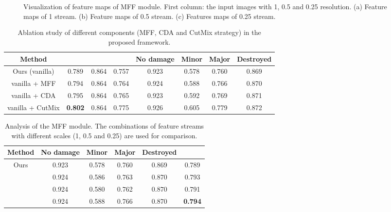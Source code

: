 \documentclass[journal]{IEEEtran}
\begin{document}
\begin{figure}[t]
	\centering
	  \\
	   \\
	\caption{Visualization of feature maps of MFF module. First column: the input images with 1, 0.5 and 0.25 resolution. (a) Feature maps of 1 stream. (b) Feature maps of 0.5 stream. (c) Features maps of 0.25 stream.}
	\label{figMscale}
\end{figure}


\begin{table*}[!t]
	\centering
	\caption{Ablation study of different components (MFF, CDA and CutMix strategy) in the proposed framework. }
	\begin{tabular}{c|ccccccc}
		\hline
		\hline
    \textbf{Method}     &     &  &  & No damage & Minor & Major & Destroyed \\
    \hline
     Ours (vanilla) & 0.789 & 0.864 &	0.757 &	0.923 &	0.578 &	0.760 &	0.869 \\
     vanilla + MFF   & 0.794  &  0.864    & 0.764  & 0.924 & 0.588 & 0.766 &0.870\\
     vanilla + CDA   & 0.795  &  0.864    & 0.765  & 0.923 & 0.592 & 0.769 & 0.871 \\
     vanilla + CutMix  & \textbf{0.802}  &  0.864    & 0.775  & 0.926 & 0.605 & 0.779 & 0.872 \\
		\hline  \hline
	\end{tabular}
\label{tabAblitation}
\end{table*}


\begin{table}[!t]
	\centering
	\caption{Analysis of the MFF module. The combinations of feature streams with different scales (1, 0.5 and 0.25) are used for comparison. }
	\setlength{\tabcolsep}{1.15mm} {
	\begin{tabular}{c|cccc|c}
	\hline \hline
    Method    & No damage & Minor & Major & Destroyed  &  \\
    \hline
    Ours  &0.923 &0.578 &0.760 &0.869 & 0.789  \\
        &  0.924 & 0.586 &  0.763  & 0.870   & 0.793\\
        & 0.924 &  0.580  & 0.762  & 0.870 &0.791\\
         &   0.924 & 0.588 & 0.766 &0.870    & \textbf{0.794}\\
		\hline  \hline
	\end{tabular}}
\label{tabAbNMFF}
\end{table}
\end{document}
